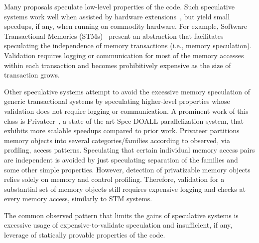 Many proposals speculate low-level properties of the code.
%
Such speculative systems work well when assisted by hardware
extensions~\cite{TLS papers...}, but yield small speedups, if any, when running
on commodity hardware.
For example, Software Transactional Memories (STMs)~\cite{stmlite, ..} present
an abstraction that facilitates speculating the independence of memory
transactions (i.e., memory speculation). Validation requires logging or
communication for most of the memory accesses within each transaction and
becomes prohibitively expensive as the size of transaction grows.
%

Other speculative systems attempt to avoid the excessive memory speculation of
generic transactional systems by speculating higher-level properties whose
validation does not require logging or communication.
%
A prominent work of this class is Privateer~\cite{johnson:12:pldi:short}, a
state-of-the-art Spec-DOALL parallelization system, that exhibits more scalable
speedups compared to prior work.
%
Privateer partitions memory objects into several categories/families according
to observed, via profiling, access patterns.  Speculating that certain
individual memory access pairs are independent is avoided by just speculating
separation of the families and some other simple properties.  However, detection
of privatizable memory objects relies solely on memory and control profiling.
Therefore, validation for a substantial set of memory objects still requires
expensive logging and checks at every memory access, similarly to STM systems.
%

The common observed pattern that limits the gains of speculative systems is
excessive usage of expensive-to-validate speculation and insufficient, if any,
leverage of statically provable properties of the code.

